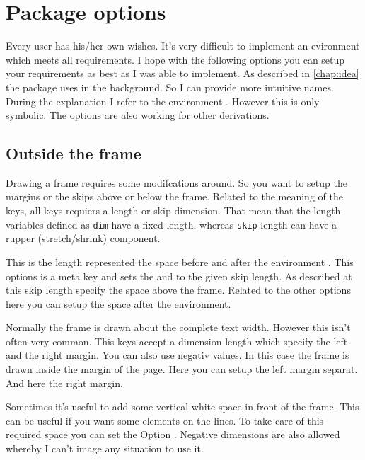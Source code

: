 \documentclass[openany,12pt,tocdepth=3]{ltx-md}
\begin{document}
\chapter{Package options}\label{chap:options}
Every user has his/her own wishes. It's very difficult to implement an evironment 
which meets all requirements. I hope with the following options you can setup your 
requirements as best as I was able to implement. As described in \autoref{chap:idea}
the package uses  in the background. So I can provide more intuitive names.
During the explanation I refer to the environment . However this is only
symbolic. The options are also working for other derivations. 

\section{Outside the frame}
Drawing a frame requires some modifcations around. So you want to setup the margins
or the skips above or below the frame. Related to the meaning of the keys, all keys 
requiers a length or skip dimension. That mean that the length variables defined as
\texttt{dim} have a fixed length, whereas \texttt{skip} length can have a rupper (stretch/shrink) component. 



This is the length represented the space before and after the environment .  
This options is a meta key and sets the  and  to the given skip length. 
As described at  this skip length specify the space above the frame.
Related to the other options here you can setup the space after the environment.


Normally the frame  is drawn about the complete text width. However this isn't
often very common. This keys accept a dimension length which specify the left and the right margin.
You can also use negativ values. In this case the frame is drawn inside the margin of the page.
Here you can setup the left margin separat. 
And here the right margin. 

Sometimes it's useful to add some vertical white space in front of the frame. This can be useful
if you want some elements on the lines. To take care of this required space you can
set the Option . Negative dimensions are also allowed whereby I can't
image any situation to use it. 
\end{document}
